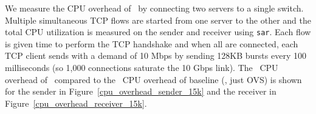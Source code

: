 %
%
%

We measure the CPU overhead of~\acdc{} by connecting two servers to a single switch. 
Multiple simultaneous TCP flows are started from one server to the other and the total CPU utilization
is measured on the sender and receiver using {\tt sar}. Each flow is given time to perform the TCP handshake
and when all are connected, each TCP client sends with a demand of 10 Mbps by sending 128KB bursts every 100 milliseconds (so 1,000 connections saturate the 10 Gbps link). 
The~ CPU overhead of~\acdc{} compared to the~ CPU overhead of baseline (\ie{}, just OVS) 
is shown for the sender in Figure~\ref{cpu_overhead_sender_15k}
 and the receiver in Figure~\ref{cpu_overhead_receiver_15k}.~


